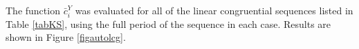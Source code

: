 \documentclass[dvips]{article}
\begin{document}
The function $\bar{c}^{Y}_{i}$ was evaluated for all of the linear
congruential sequences listed in Table \ref{tabKS}, using the
full period of the sequence in each case.  Results are shown in Figure
\ref{figautolcg}.
\begin{figure}[htbp]
\begin{center}
\quad
{}\quad
{}\quad

\end{center}
\end{figure}
\end{document}
